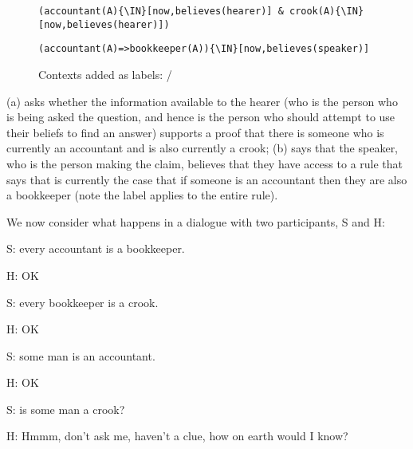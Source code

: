 \documentclass[11pt,a4paper]{article}
\newcommand{\IN}{$\in$}
\begin{document}
\begin{figure}[ht]
\begin{center}
\begin{minipage}[t]{0.9\linewidth}
\begin{Verbatim}[commandchars=\\\{\}]
(accountant(A){\IN}[now,believes(hearer)] & crook(A){\IN}[now,believes(hearer)])
\end{Verbatim}

\end{minipage}

\vspace{0.2in}
\begin{minipage}[t]{0.45\linewidth}
\begin{Verbatim}[commandchars=\\\{\}]
(accountant(A)=>bookkeeper(A)){\IN}[now,believes(speaker)]
\end{Verbatim}

\end{minipage}
\end{center}
\caption{Contexts added as labels: /}\label{LABELS}
\end{figure}

\noindent
{}(a) asks whether the information available to the hearer
(who is the person who is being asked the question, and hence is the
person who should attempt to use their beliefs to find an answer) supports a
proof that there is someone who is currently an accountant and is also
currently a crook; (b) says that the speaker, who is the
person making the claim, believes that they have access to a rule that
says that is currently the case that if someone is an accountant then
they are also a bookkeeper (note the label applies to the entire
rule).

We now consider what happens in a dialogue with two participants, S and H:

\begin{examples}
\item\label{DIALOGUE:1}
S: every accountant is a bookkeeper.

H: OK

S: every bookkeeper is a crook.

H: OK

S: some man is an accountant.

H: OK

S: is some man a crook?

H: Hmmm, don't ask me, haven't a clue, how on earth would I know?
\end{examples}
\end{document}
